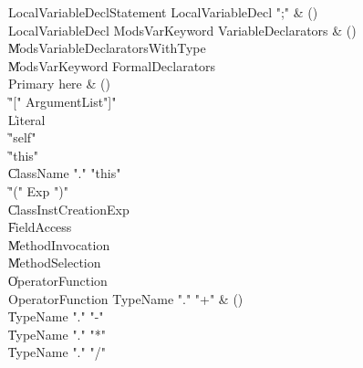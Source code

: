 \begin{bbgrammar}
 LocalVariableDeclStatement  \label{prod:LocalVariableDeclStatement}  \: LocalVariableDecl \xcd";" & ()\\
 LocalVariableDecl  \label{prod:LocalVariableDecl}  \: Mods\opt VarKeyword VariableDeclarators & ()\\
    \| Mods\opt VariableDeclaratorsWithType\\
    \| Mods\opt VarKeyword FormalDeclarators\\
 Primary  \label{prod:Primary}  \: here & ()\\
    \| \xcd"[" ArgumentList\opt \xcd"]"\\
    \| Literal\\
    \| \xcd"self"\\
    \| \xcd"this"\\
    \| ClassName \xcd"." \xcd"this"\\
    \| \xcd"(" Exp \xcd")"\\
    \| ClassInstCreationExp\\
    \| FieldAccess\\
    \| MethodInvocation\\
    \| MethodSelection\\
    \| OperatorFunction\\
 OperatorFunction  \label{prod:OperatorFunction}  \: TypeName \xcd"." \xcd"+" & ()\\
    \| TypeName \xcd"." \xcd"-"\\
    \| TypeName \xcd"." \xcd"*"\\
    \| TypeName \xcd"." \xcd"/"\\
\end{bbgrammar}


